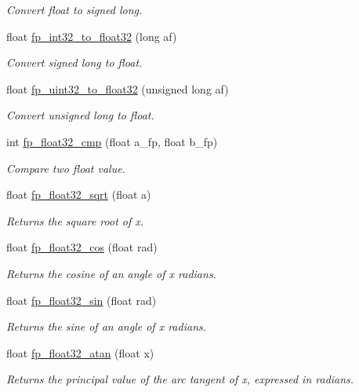 \begin{DoxyCompactItemize}
\begin{DoxyCompactList}\small\item\em Convert float to signed long. \end{DoxyCompactList}\item 
float \mbox{\hyperlink{a00023_a13d2d336c17fa7ca9867415d017039f9}{fp\+\_\+int32\+\_\+to\+\_\+float32}} (long af)
\begin{DoxyCompactList}\small\item\em Convert signed long to float. \end{DoxyCompactList}\item 
float \mbox{\hyperlink{a00023_a096ed4a261247431549a71225761fffc}{fp\+\_\+uint32\+\_\+to\+\_\+float32}} (unsigned long af)
\begin{DoxyCompactList}\small\item\em Convert unsigned long to float. \end{DoxyCompactList}\item 
int \mbox{\hyperlink{a00023_a55ee0ff6cc8f2a97c7079024577d33d3}{fp\+\_\+float32\+\_\+cmp}} (float a\+\_\+fp, float b\+\_\+fp)
\begin{DoxyCompactList}\small\item\em Compare two float value. \end{DoxyCompactList}\item 
float \mbox{\hyperlink{a00023_a310b7eb83e737130e48a8d4b0853efd5}{fp\+\_\+float32\+\_\+sqrt}} (float a)
\begin{DoxyCompactList}\small\item\em Returns the square root of x. \end{DoxyCompactList}\item 
float \mbox{\hyperlink{a00023_a76d63763a1fbbbed015ad39ff22a1a99}{fp\+\_\+float32\+\_\+cos}} (float rad)
\begin{DoxyCompactList}\small\item\em Returns the cosine of an angle of x radians. \end{DoxyCompactList}\item 
float \mbox{\hyperlink{a00023_ae57383891f734bc754b6ade61fed3677}{fp\+\_\+float32\+\_\+sin}} (float rad)
\begin{DoxyCompactList}\small\item\em Returns the sine of an angle of x radians. \end{DoxyCompactList}\item 
float \mbox{\hyperlink{a00023_afff3776b0834631c841e3799f545f7a0}{fp\+\_\+float32\+\_\+atan}} (float x)
\begin{DoxyCompactList}\small\item\em Returns the principal value of the arc tangent of x, expressed in radians. \end{DoxyCompactList}\item 

\end{DoxyCompactItemize}
